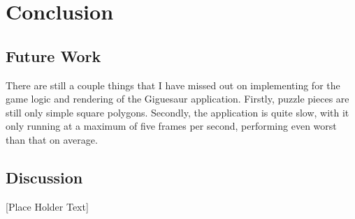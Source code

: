 \documentclass{article}
\begin{document}
\section{Conclusion}

\subsection{Future Work}
There are still a couple things that I have missed out on implementing for the
game logic and rendering of the Giguesaur application. Firstly, puzzle pieces
are still only simple square polygons. Secondly, the application is quite slow,
with it only running at a maximum of five frames per second, performing even
worst than that on average.

\subsection{Discussion}
[Place Holder Text]



\clearpage



\end{document}

